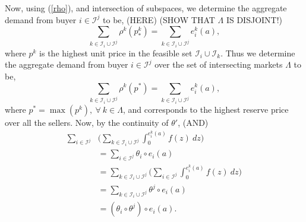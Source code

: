 \documentclass[12pt]{article}
\theoremstyle{definition}
\newcommand{\mcI}{\mathcal{I}}
\DeclareMathOperator*{\argmin}{arg\,min}
\begin{document}
\begin{multicols}{2}
Now, using (\ref{rho}), and intersection of subspaces, we determine the aggregate demand from buyer
$i\in\mcI^j$ to be, (HERE)
(SHOW THAT $\Lambda$ IS DISJOINT!)
\begin{equation}\label{sumrho}
    \displaystyle\sum_{k\in\mcI_i\cup\mcI^j}\rho^k(p_*^k) =
\sum_{k\in\mcI_i\cup\mcI^j}
e_i^k(a),
\end{equation}
where $p^k$ is the highest unit price in the feasible set $\mcI_i\cup\mcI_k$.
Thus we determine the aggregate demand from buyer
$i\in\mcI^j$ over the set of intersecting markets $\Lambda$ to be, 
\begin{equation}\label{sumrho}
    \displaystyle\sum_{k\in\mcI_i\cup\mcI^j}\rho^k(p^*) =
\sum_{k\in\mcI_i\cup\mcI^j}
e_i^k(a),
\end{equation}
where $p^* = \max(p^k), \ \forall \ k \in\Lambda$, and corresponds to the
highest reserve price over all the sellers. 
Now, by the continuity of $\theta'$, (AND)
\begin{align*}
     \displaystyle\sum_{i\in\mcI^j} &\bigg(\sum_{k\in\mcI_i\cup\mcI^j}\int_0^{e_i^k(a)}
f(z) \ dz\bigg)\\
     &=\displaystyle\sum_{i\in\mcI^j} \theta_i \circ e_i(a) \\
     &= \sum_{k\in\mcI_i\cup\mcI^j}\bigg(\sum_{i\in\mcI^j}\int_0^{e_i^k(a)}
f(z) \ dz\bigg)\\
     &= \sum_{k\in\mcI_i\cup\mcI^j}\theta^j \circ e_i(a)\\
     &= (\theta_i \circ \theta^j) \circ e_i(a).
\end{align*}


\iffalse
************************
Proposition \ref{buyerstrategy} defines $e_i^j(a) = D_i/ 2$, and so $0 <
e_i^j(a)$.
************************
\fi
\iffalse
Suppose $\exists \ i \in\mcI^j$ such that $\mcI_i = j$, so that $j$ is the only
seller in $\Lambda$.
, and $i$'s bid quantity,
\begin{equation}\label{iquantity}
    d_i^* = \circ e_i(a) = \frac{a_i^j}{j},
\end{equation}
where $j=j^* = \argmin$ for each $i\in\mcI^j$, thus $d_i^*$ represents $i$'s coordinated bid quantity, and we have
$s_i^j = (p_i^*,d_i^*), \ \forall \ j$ such that $s_i^j > 0$,
\fi
\iffalse


\end{multicols}
\end{document}
